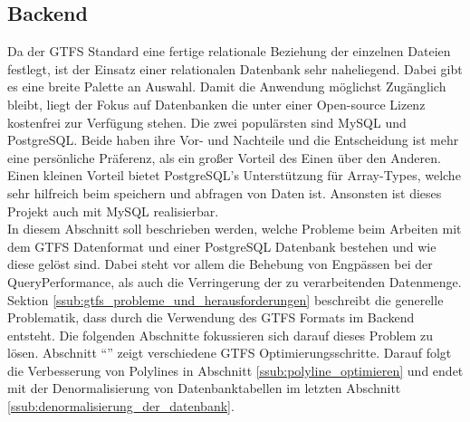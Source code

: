 \subsection{Backend}
\label{sub:backend}
  Da der GTFS Standard eine fertige relationale Beziehung der einzelnen Dateien festlegt, ist der Einsatz einer relationalen Datenbank sehr naheliegend. Dabei gibt es eine breite Palette an Auswahl. Damit die Anwendung möglichst Zugänglich bleibt, liegt der Fokus auf Datenbanken die unter einer Open-source Lizenz kostenfrei zur Verfügung stehen. Die zwei populärsten sind MySQL und PostgreSQL\parencite{db_engines}. Beide haben ihre Vor- und Nachteile und die Entscheidung ist mehr eine persönliche Präferenz, als ein großer Vorteil des Einen über den Anderen. Einen kleinen Vorteil bietet PostgreSQL's Unterstützung für Array-Types, welche sehr hilfreich beim speichern und abfragen von Daten ist. Ansonsten ist dieses Projekt auch mit MySQL realisierbar.\\

  In diesem Abschnitt soll beschrieben werden, welche Probleme beim Arbeiten mit dem GTFS Datenformat und einer PostgreSQL Datenbank bestehen und wie diese gelöst sind. Dabei steht vor allem die Behebung von Engpässen bei der Query\footnotemark Performance, als auch die Verringerung der zu verarbeitenden Datenmenge. Sektion \ref{ssub:gtfs_probleme_und_herausforderungen} beschreibt die generelle Problematik, dass durch die Verwendung des GTFS Formats im Backend entsteht. Die folgenden Abschnitte fokussieren sich darauf dieses Problem zu lösen. Abschnitt "`"' zeigt verschiedene GTFS Optimierungsschritte. Darauf folgt die Verbesserung von Polylines in Abschnitt \ref{ssub:polyline_optimieren} und endet mit der Denormalisierung von Datenbanktabellen im letzten Abschnitt \ref{ssub:denormalisierung_der_datenbank}.

  

  
  
  
  
  
  
  
